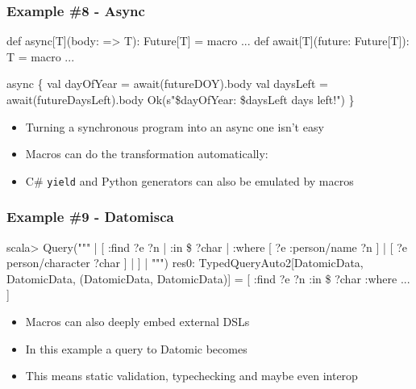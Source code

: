 \documentclass[svgnames,hyperref={bookmarks=false}]{beamer}
\begin{document}
\begin{frame}[fragile, t]
\frametitle{Example \#8 - Async}

\begin{semiverbatim}
\alert{def async[T](body: => T): Future[T] = macro ...}
\alert{def await[T](future: Future[T]): T = macro ...}

\alert{async \{}
  val dayOfYear = \alert{await(}futureDOY\alert{)}.body
  val daysLeft = \alert{await(}futureDaysLeft\alert{)}.body
  Ok(s"\$dayOfYear: \$daysLeft days left!")
\alert{\}}



\end{semiverbatim}

\begin{itemize}
\item Turning a synchronous program into an async one isn't easy
\item Macros can do the transformation automatically: 
\item C\# \texttt{yield} and Python generators can also be emulated by macros
\end{itemize}
\end{frame}

\begin{frame}[fragile, t]
\frametitle{Example \#9 - Datomisca}
\begin{semiverbatim}
scala> \alert{Query(}"""
|      [ :find ?e ?n
|        :in \$ ?char
|        :where  [ ?e :person/name ?n ]
|                [ ?e person/character ?char ]
|      ]
|      """\alert{)}
res0: TypedQueryAuto2[DatomicData, DatomicData, (DatomicData,
DatomicData)] = [ :find ?e ?n :in \$ ?char :where ... ]

\end{semiverbatim}

\begin{itemize}
\item Macros can also deeply embed external DSLs
\item In this example a query to Datomic becomes 
\item This means static validation, typechecking and maybe even interop
\end{itemize}
\end{frame}

\end{document}
